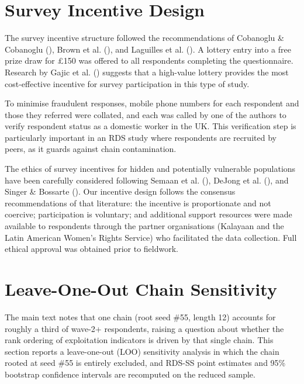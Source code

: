 \documentclass[
  12pt,
  letterpaper,
  DIV=11,
  numbers=noendperiod]{scrreprt}
\begin{document}
\section{Survey Incentive Design}\label{sec-d-incentive}

The survey incentive structure followed the recommendations of Cobanoglu
\& Cobanoglu (), Brown et al.
(), and Laguilles et al.
(). A lottery entry into a free
prize draw for £150 was offered to all respondents completing the
questionnaire. Research by Gajic et al.
() suggests that a
high-value lottery provides the most cost-effective incentive for survey
participation in this type of study.

To minimise fraudulent responses, mobile phone numbers for each
respondent and those they referred were collated, and each was called by
one of the authors to verify respondent status as a domestic worker in
the UK. This verification step is particularly important in an RDS study
where respondents are recruited by peers, as it guards against chain
contamination.

The ethics of survey incentives for hidden and potentially vulnerable
populations have been carefully considered following Semaan et al.
(), DeJong et al.
(), and Singer \& Bossarte
(). Our incentive design
follows the consensus recommendations of that literature: the incentive
is proportionate and not coercive; participation is voluntary; and
additional support resources were made available to respondents through
the partner organisations (Kalayaan and the Latin American Women's
Rights Service) who facilitated the data collection. Full ethical
approval was obtained prior to fieldwork.

\section{Leave-One-Out Chain Sensitivity}\label{sec-d-loo}

The main text notes that one chain (root seed \#55, length 12) accounts
for roughly a third of wave-2+ respondents, raising a question about
whether the rank ordering of exploitation indicators is driven by that
single chain. This section reports a leave-one-out (LOO) sensitivity
analysis in which the chain rooted at seed \#55 is entirely excluded,
and RDS-SS point estimates and 95\% bootstrap confidence intervals are
recomputed on the reduced sample.
\end{document}
